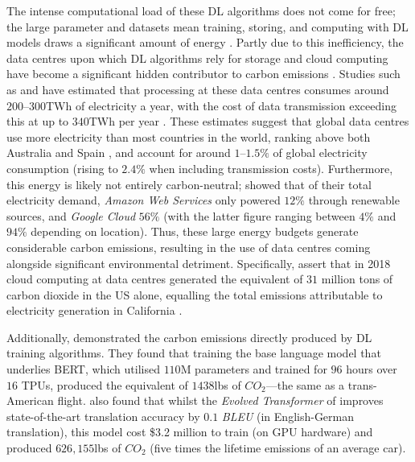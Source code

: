 \documentclass[a4paper, 11pt]{report}
\begin{document}
    The intense computational load of these DL algorithms does not come for free; the large parameter and datasets mean training, storing, and computing with DL models draws a significant amount of energy \citep{bietti-2019}. Partly due to this inefficiency, the data centres upon which DL algorithms rely for storage and cloud computing have become a significant hidden contributor to carbon emissions \citep{aljarrah-2015}. Studies such as \citet{masanet-2020} and \citet{malmodin-2018} have estimated that processing at these data centres consumes around $200\text{--}300$TWh of electricity a year, with the cost of data transmission exceeding this at up to $340$TWh per year \citep{iea-2022}. These estimates suggest that global data centres use more electricity than most countries in the world, ranking above both Australia and Spain \citep{eia-2019}, and account for around $1\text{--}1.5\%$ of global electricity consumption (rising to $2.4\%$ when including transmission costs). Furthermore, this energy is likely not entirely carbon-neutral; \citet{cook-2017} showed that of their total electricity demand, \emph{Amazon Web Services} only powered $12\%$ through renewable sources, and \emph{Google Cloud} $56\%$ (with the latter figure ranging between $4\%$ and $94\%$ depending on location). Thus, these large energy budgets generate considerable carbon emissions, resulting in the use of data centres coming alongside significant environmental detriment. Specifically, \citet{hockstad-2018} assert that in 2018 cloud computing at data centres generated the equivalent of $31$ million tons of carbon dioxide in the US alone, equalling the total emissions attributable to electricity generation in California \citep{iea-2022}.
    
    Additionally, \citet{strubell-2019} demonstrated the carbon emissions directly produced by DL training algorithms. They found that training the base language model that underlies BERT, which utilised $110$M parameters and trained for $96$ hours over $16$ TPUs, produced the equivalent of $1438$lbs of $CO_2$---the same as a trans-American flight. \citet{strubell-2019} also found that whilst the \emph{Evolved Transformer} of \citet{so-2019} improves state-of-the-art translation accuracy by $0.1$ \emph{BLEU} (in English-German translation), this model cost \$3.2 million to train (on GPU hardware) and produced $626,155$lbs of $CO_2$ (five times the lifetime emissions of an average car).
\end{document}
